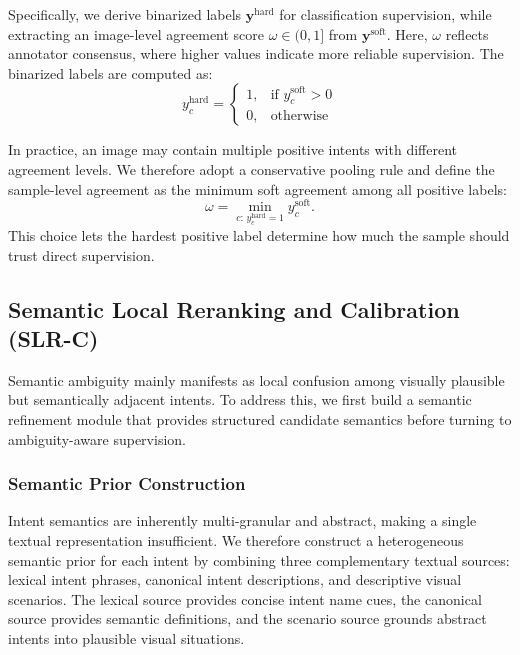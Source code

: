 Specifically, we derive binarized labels $\mathbf{y}^{\text{hard}}$ for classification supervision, while extracting an image-level agreement score $\omega \in (0,1]$ from $\mathbf{y}^{\text{soft}}$. Here, $\omega$ reflects annotator consensus, where higher values indicate more reliable supervision. The binarized labels are computed as:
\begin{equation}
y^{\text{hard}}_{c} =
\begin{cases}
1, & \text{if } y^{\text{soft}}_{c} > 0 \\
0, & \text{otherwise}
\end{cases}
\end{equation}

In practice, an image may contain multiple positive intents with different agreement levels. We therefore adopt a conservative pooling rule and define the sample-level agreement as the minimum soft agreement among all positive labels:
\begin{equation}
\omega = \min_{c:\, y^{\text{hard}}_{c}=1} y^{\text{soft}}_{c}.
\end{equation}
This choice lets the hardest positive label determine how much the sample should trust direct supervision.

\subsection{Semantic Local Reranking and Calibration (SLR-C)}

Semantic ambiguity mainly manifests as local confusion among visually plausible but semantically adjacent intents. To address this, we first build a semantic refinement module that provides structured candidate semantics before turning to ambiguity-aware supervision.

\subsubsection{Semantic Prior Construction}

Intent semantics are inherently multi-granular and abstract, making a single textual representation insufficient. We therefore construct a heterogeneous semantic prior for each intent by combining three complementary textual sources: lexical intent phrases, canonical intent descriptions, and descriptive visual scenarios. The lexical source provides concise intent name cues, the canonical source provides semantic definitions, and the scenario source grounds abstract intents into plausible visual situations.

